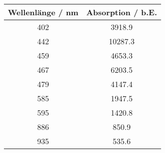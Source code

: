 \begin{center}
\begin{tabular}{|c|c|}
\hline
Wellenlänge / nm & Absorption / b.E. \\ \hline
402 & 3918.9 \\ \hline
442 & 10287.3 \\ \hline
459 & 4653.3 \\ \hline
467 & 6203.5 \\ \hline
479 & 4147.4 \\ \hline
585 & 1947.5 \\ \hline
595 & 1420.8 \\ \hline
886 & 850.9 \\ \hline
935 & 535.6 \\ \hline
\end{tabular}
\end{center}